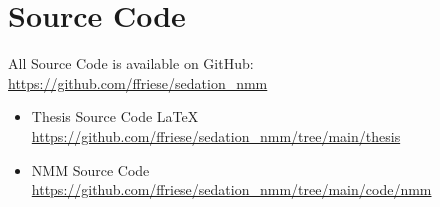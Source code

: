 \chapter{Source Code}\label{ch:source_code}

All Source Code is available on GitHub: \\
 \url{https://github.com/ffriese/sedation_nmm}
\begin{itemize}
    \item \textcolor{pyratesdarkred}{} Thesis Source Code \textcolor{modernblue}{\LaTeX{}} \\
        \url{https://github.com/ffriese/sedation_nmm/tree/main/thesis}
    \item \textcolor{pyratesdarkred}{} NMM Source Code \textcolor{modernblue}{} \\
        \url{https://github.com/ffriese/sedation_nmm/tree/main/code/nmm}
\end{itemize}